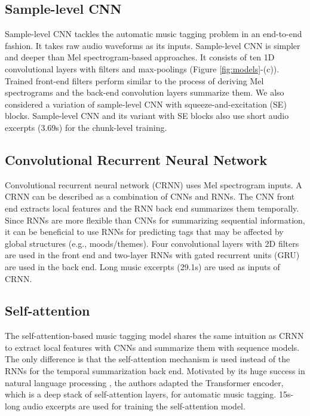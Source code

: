 \documentclass{article}
\begin{document}
\subsection{Sample-level CNN}
Sample-level CNN \cite{lee2017sample} tackles the automatic music tagging problem in an end-to-end fashion. It takes raw audio waveforms as its inputs. Sample-level CNN is simpler and deeper than Mel spectrogram-based approaches. It consists of ten 1D convolutional layers with  filters and  max-poolings (Figure \ref{fig:models}-(c)). Trained front-end filters perform similar to the process of deriving Mel spectrograms and the back-end convolution layers summarize them. 
We also considered a variation of sample-level CNN \cite{kim2018sample} with squeeze-and-excitation (SE) \cite{hu2018squeeze} blocks. Sample-level CNN and its variant with SE blocks also use short audio excerpts (3.69s) for the chunk-level training.



\subsection{Convolutional Recurrent Neural Network}
Convolutional recurrent neural network (CRNN) \cite{choi2017convolutional} uses Mel spectrogram inputs. A CRNN can be described as a combination of CNNs and RNNs. The CNN front end extracts local features and the RNN back end summarizes them temporally. Since RNNs are more flexible than CNNs for summarizing sequential information, it can be beneficial to use RNNs for predicting tags that may be affected by global structures (e.g., moods/themes). Four convolutional layers with  2D filters are used in the front end and two-layer RNNs with gated recurrent units (GRU) are used in the back end. Long music excerpts (29.1s) are used as inputs of CRNN.


\subsection{Self-attention}
The self-attention-based music tagging model \cite{won2019toward} shares the same intuition as CRNN to extract local features with CNNs and summarize them with sequence models. The only difference is that the self-attention mechanism is used instead of the RNNs for the temporal summarization back end. Motivated by its huge success in natural language processing \cite{devlin2018bert}, the authors adapted the Transformer encoder, which is a deep stack of self-attention layers, for automatic music tagging. 15s-long audio excerpts are used for training the self-attention model.
\end{document}
